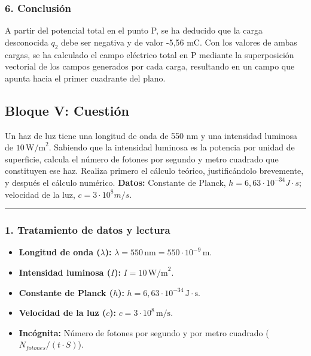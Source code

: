 \subsubsection*{6. Conclusión}
\begin{cajaconclusion}
A partir del potencial total en el punto P, se ha deducido que la carga desconocida $q_2$ debe ser negativa y de valor -5,56 mC. Con los valores de ambas cargas, se ha calculado el campo eléctrico total en P mediante la superposición vectorial de los campos generados por cada carga, resultando en un campo que apunta hacia el primer cuadrante del plano.
\end{cajaconclusion}

\newpage

\subsection{Bloque V: Cuestión}
\label{subsec:A5_2012_jun_ord}
\begin{cajaenunciado}
Un haz de luz tiene una longitud de onda de 550 nm y una intensidad luminosa de $10\,\text{W/m}^2$. Sabiendo que la intensidad luminosa es la potencia por unidad de superficie, calcula el número de fotones por segundo y metro cuadrado que constituyen ese haz. Realiza primero el cálculo teórico, justificándolo brevemente, y después el cálculo numérico.
\textbf{Datos:} Constante de Planck, $h=6,63\cdot10^{-34}J\cdot s$; velocidad de la luz, $c=3\cdot10^{8}m/s.$
\end{cajaenunciado}
\hrule

\subsubsection*{1. Tratamiento de datos y lectura}
\begin{itemize}
    \item \textbf{Longitud de onda ($\lambda$):} $\lambda = 550\,\text{nm} = 550 \cdot 10^{-9}\,\text{m}$.
    \item \textbf{Intensidad luminosa ($I$):} $I = 10\,\text{W/m}^2$.
    \item \textbf{Constante de Planck ($h$):} $h = 6,63 \cdot 10^{-34}\,\text{J}\cdot\text{s}$.
    \item \textbf{Velocidad de la luz ($c$):} $c = 3 \cdot 10^8\,\text{m/s}$.
    \item \textbf{Incógnita:} Número de fotones por segundo y por metro cuadrado ($N_{fotones}/(t \cdot S)$).
\end{itemize}

